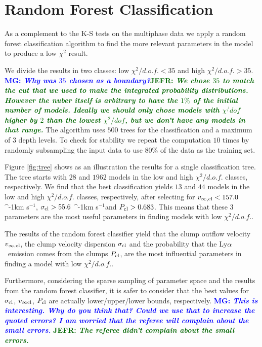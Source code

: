 \documentclass[a4,useAMS,usenatbib,usegraphicx]{mn2e}
\newcommand{\lya}{\ifmmode{{\rm Ly}\alpha}\else Ly$\alpha$\ \fi}
\newcommand{\kms}{\ifmmode\mathrm{km\ s}^{-1}\else km s$^{-1}$\fi}
\newcommand{\mg}[1]{\textcolor{blue}{\bf MG: \textit{#1}}}
\newcommand{\jefr}[1]{\textcolor{darkgreen}{\bf JEFR: \textit{#1}}}
\begin{document}
\appendix
\section{Random Forest Classification}
\label{appendix}

As a complement to the K-S tests on the multiphase data 
we apply a random forest classification algorithm to find the
more relevant parameters in the model to produce a low $\chi^2$
result. 


We divide
the results in two classes: low $\chi^2/d.o.f.<35$ and high
$\chi^2/d.o.f.>35$. \mg{Why was $35$ chosen as a boundary?}\jefr{We
  chose $35$ to match the cut that we used to make the  integrated
  probability distributions. However the nuber itself is
  arbitrary to have the $1\%$ of the initial number of models. 
Ideally we should only chose models with $\chi^/dof$
  higher by $2$ than the lowest $\chi^2/dof$, but we don't have any
  models in that range.}
The algorithm uses $500$ trees for the classification and a
maximum of $3$ depth levels. 
To check for stability we repeat the computation $10$ times by
randomly subsampling the input data to use $80\%$ of the data as
the training set.

Figure \ref{fig:tree} shows as an illustration the results for a
single classification tree.
The tree starts with $28$ and $1962$ models in the low and high
$\chi^2/d.o.f.$ classes, respectively. 
We find that the best classification
yields $13$ and $44$ models in the low and high $\chi^2/d.o.f.$
classes, respectively, after selecting for $v_{\infty,{\rm cl}}<157.0$ \kms,
$\sigma_{{\rm cl}}>55.6$ \kms and $P_{\rm cl}>0.683$. 
This means that these 3 parameters are the most useful parameters
in finding models with low $\chi^2/d.o.f.$.

The results of the random forest classifier yield that the clump outflow velocity
$v_{\infty,\rm{cl}}$, the clump velocity dispersion $\sigma_{\rm cl}$ and the probability
that the \lya emission comes from the clumps $P_{\rm cl}$, are the
most influential parameters in finding a model with low
$\chi^2/d.o.f.$.

Furthermore, considering the sparse sampling of parameter space and the results
from the random forest classifier, it is safer to consider that
the best values for $\sigma_{\rm cl}$, $v_{\infty {\rm cl}}$, $P_{\rm
  cl}$ are actually lower/upper/lower bounds, respectively.
\mg{This is interesting. Why do you think that? Could we use that to
  increase the quoted errors? I am worried that the referee will
  complain about the small errors.} \jefr{The referee didn't complain
  about the small errors.}
\end{document}
